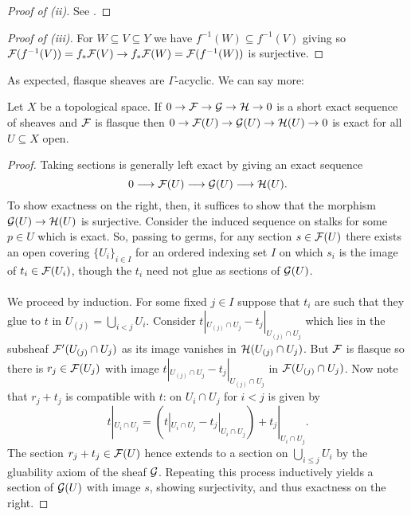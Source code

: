 \begin{proof}[Proof of (ii)]
    See \cite[\href{https://stacks.math.columbia.edu/tag/01EA}{Tag 01EA}]{stacks-project}. 
\end{proof}
\begin{proof}[Proof of (iii)]
    For $W\subseteq V\subseteq Y$ we have $f^{-1}(W)\subseteq f^{-1}(V)$ giving so $\mathcal{F}(f^{-1}(V))=f_{*}\mathcal{F}(V)\to f_{*}\mathcal{F}(W)=\mathcal{F}(f^{-1}(W))$ is surjective. 
\end{proof}
As expected, flasque sheaves are $\Gamma$-acyclic. We can say more:
\begin{proposition}\label{prop: flasque sheaves are gamma acyclic}
    Let $X$ be a topological space. If $0\to\mathcal{F}\to\mathcal{G}\to\mathcal{H}\to0$ is a short exact sequence of sheaves and $\mathcal{F}$ is flasque then $0\to\mathcal{F}(U)\to\mathcal{G}(U)\to\mathcal{H}(U)\to0$ is exact for all $U\subseteq X$ open. 
\end{proposition}
\begin{proof}
    Taking sections is generally left exact by  giving an exact sequence 
    $$0\longrightarrow\mathcal{F}(U)\longrightarrow\mathcal{G}(U)\longrightarrow\mathcal{H}(U).$$ 
    To show exactness on the right, then, it suffices to show that the morphism $\mathcal{G}(U)\to\mathcal{H}(U)$ is surjective. Consider the induced sequence on stalks for some $p\in U$ which is exact. So, passing to germs, for any section $s\in\mathcal{F}(U)$ there exists an open covering $\{U_{i}\}_{i\in I}$ for an ordered indexing set $I$ on which $s_{i}$ is the image of $t_{i}\in\mathcal{F}(U_{i})$, though the $t_{i}$ need not glue as sections of $\mathcal{G}(U)$. 
    \\\\
    We proceed by induction. For some fixed $j\in I$ suppose that $t_{i}$ are such that they glue to $t$ in $U_{(j)}=\bigcup_{i<j}U_{i}$. Consider $t|_{U_{(j)}\cap U_{j}}-t_{j}|_{U_{(j)}\cap U_{j}}$ which lies in the subsheaf $\mathcal{F}'(U_{(j)}\cap U_{j})$ as its image vanishes in $\mathcal{H}(U_{(j)}\cap U_{j})$. But $\mathcal{F}$ is flasque so there is $r_{j}\in\mathcal{F}(U_{j})$ with image $t|_{U_{(j)}\cap U_{j}}-t_{j}|_{U_{(j)}\cap U_{j}}$ in $\mathcal{F}(U_{(j)}\cap U_{j})$. Now note that $r_{j}+t_{j}$ is compatible with $t$: on $U_{i}\cap U_{j}$ for $i<j$ is given by 
    $$t|_{U_{i}\cap U_{j}}= (t|_{U_{i}\cap U_{j}} - t_{j}|_{U_{i}\cap U_{j}}) + t_{j}|_{U_{i}\cap U_{j}}.$$
    The section $r_{j}+t_{j}\in\mathcal{F}(U)$ hence extends to a section on $\bigcup_{i\leq j}U_{i}$ by the gluability axiom of the sheaf $\mathcal{G}$. Repeating this process inductively yields a section of $\mathcal{G}(U)$ with image $s$, showing surjectivity, and thus exactness on the right. 
\end{proof}
